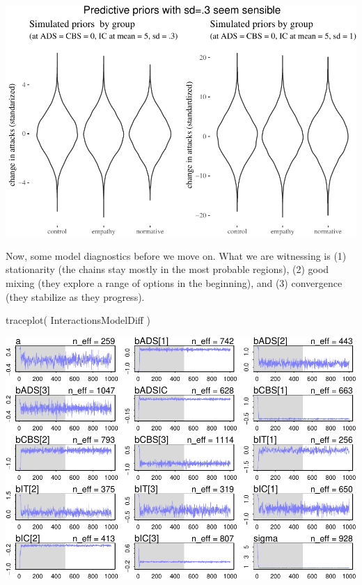\documentclass[
  10pt,
  dvipsnames,enabledeprecatedfontcommands]{scrartcl}
\newenvironment{Shaded}{\begin{snugshade}}{\end{snugshade}}
\newcommand{\FunctionTok}[1]{\textcolor[rgb]{0.00,0.00,0.00}{#1}}
\newcommand{\NormalTok}[1]{#1}
\begin{document}
\begin{center}\includegraphics[width=1\linewidth]{bayesianReport3_files/figure-latex/priors03-1} \end{center}
\normalsize

Now, some model diagnostics before we move on. What we are witnessing is
(1) stationarity (the chains stay mostly in the most probable regions),
(2) good mixing (they explore a range of options in the beginning), and
(3) convergence (they stabilize as they progress).

\vspace{1mm}
\footnotesize

\begin{Shaded}
\begin{Highlighting}[]
\FunctionTok{traceplot}\NormalTok{( InteractionsModelDiff )}
\end{Highlighting}
\end{Shaded}

\begin{center}\includegraphics[width=1\linewidth]{bayesianReport3_files/figure-latex/unnamed-chunk-6-1} \end{center}
\normalsize
\end{document}
